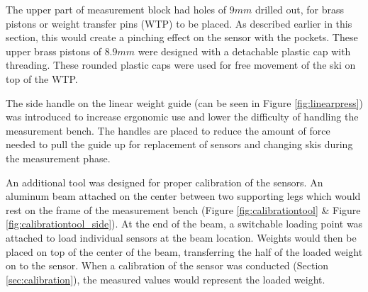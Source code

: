 The upper part of measurement block had holes of $9mm$ drilled out, for brass pistons or weight transfer pins (WTP) to be placed. As described earlier in this section, this would create a pinching effect on the sensor with the pockets. These upper brass pistons of $8.9mm$ were designed with a detachable plastic cap with threading. These rounded plastic caps were used for free movement of the ski on top of the WTP.

The side handle on the linear weight guide (can be seen in Figure \ref{fig:linearpress}) was introduced to increase ergonomic use and lower the difficulty of handling the measurement bench. The handles are placed to reduce the amount of force needed to pull the guide up for replacement of sensors and changing skis during the measurement phase.

An additional tool was designed for proper calibration of the sensors. An aluminum beam attached on the center between two supporting legs which would rest on the frame of the measurement bench (Figure \ref{fig:calibrationtool} \& Figure \ref{fig:calibrationtool_side}). At the end of the beam, a switchable loading point was attached to load individual sensors at the beam location. Weights would then be placed on top of the center of the beam, transferring the half of the loaded weight on to the sensor. When a calibration of the sensor was conducted (Section \ref{sec:calibration}), the measured values would represent the loaded weight.


